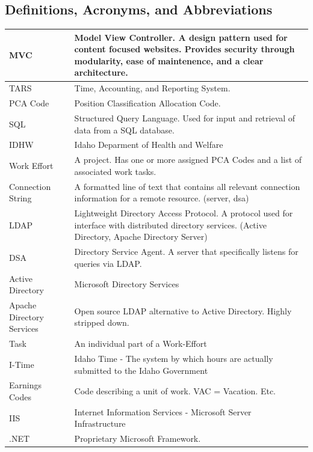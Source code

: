 \documentclass[letterpaper]{article}
\begin{document}
\subsection{\bfseries{Definitions, Acronyms, and Abbreviations}}
\begin{center}
\begin{tabular}{| l | p{10cm} |}
\hline
MVC & Model View Controller. A design pattern used for content focused websites. Provides security through modularity, ease of maintenence, and a clear architecture.\\ \hline
TARS & Time, Accounting, and Reporting System. \\ \hline
PCA Code & Position Classification Allocation Code. \\ \hline
SQL & Structured Query Language. Used for input and retrieval of data from a SQL database.\\ \hline
IDHW & Idaho Deparment of Health and Welfare \\ \hline
Work Effort & A project. Has one or more assigned PCA Codes and a list of associated work tasks.\\ \hline
Connection String & A formatted line of text that contains all relevant connection information for a remote resource. (server, dsa) \\ \hline
LDAP & Lightweight Directory Access Protocol. A protocol used for interface with distributed directory services. (Active Directory, Apache Directory Server) \\ \hline  
DSA & Directory Service Agent. A server that specifically listens for queries via LDAP. \\ \hline
Active Directory & Microsoft Directory Services \\ \hline
Apache Directory Services & Open source LDAP alternative to Active Directory. Highly stripped down. \\ \hline
Task & An individual part of a Work-Effort \\ \hline
I-Time & Idaho Time - The system by which hours are actually submitted to the Idaho Government \\ \hline
Earnings Codes & Code describing a unit of work. VAC = Vacation. Etc.\\ \hline
IIS & Internet Information Services - Microsoft Server Infrastructure \\ \hline
.NET & Proprietary Microsoft Framework. \\ \hline
\end{tabular}
\end{center}
\end{document}
